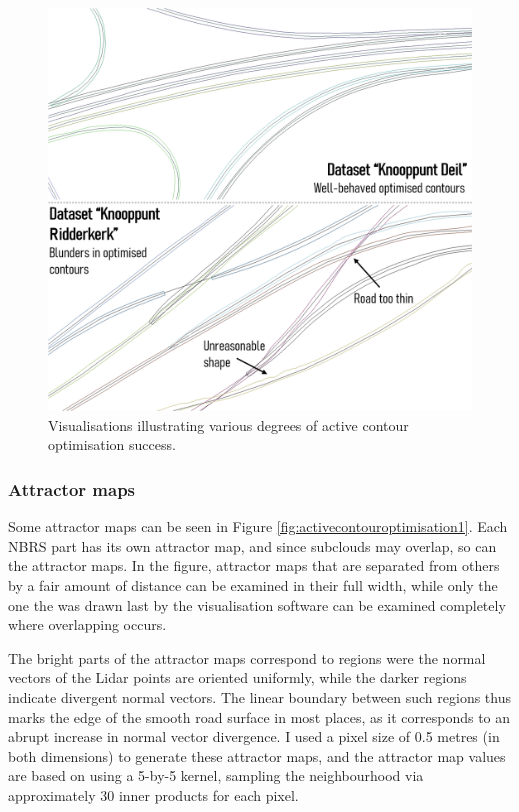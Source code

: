 \begin{figure}[h]
    \centering
    \includegraphics[width=0.84\linewidth]{final_report/figs/activecontouroptimisation0.png}
    \caption{Visualisations illustrating various degrees of active contour optimisation success.}
    \label{fig:activecontouroptimisation0}
\end{figure}

\subsubsection{Attractor maps}

Some attractor maps can be seen in Figure \ref{fig:activecontouroptimisation1}. Each NBRS part has its own attractor map, and since subclouds may overlap, so can the attractor maps. In the figure, attractor maps that are separated from others by a fair amount of distance can be examined in their full width, while only the one the was drawn last by the visualisation software can be examined completely where overlapping occurs.

The bright parts of the attractor maps correspond to regions were the normal vectors of the Lidar points are oriented uniformly, while the darker regions indicate divergent normal vectors. The linear boundary between such regions thus marks the edge of the smooth road surface in most places, as it corresponds to an abrupt increase in normal vector divergence. I used a pixel size of 0.5 metres (in both dimensions) to generate these attractor maps, and the attractor map values are based on using a 5-by-5 kernel, sampling the neighbourhood via approximately 30 inner products for each pixel.

